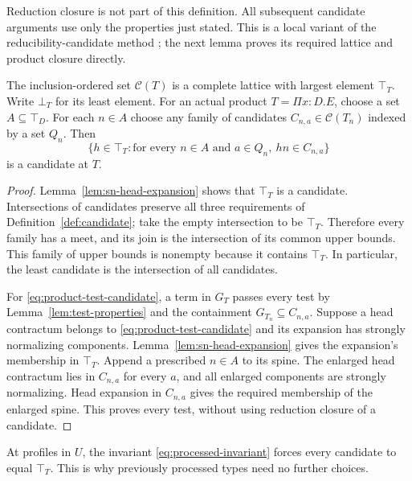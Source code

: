 Reduction closure is not part of this definition. All subsequent
candidate arguments use only the properties just stated.
This is a local variant of the reducibility-candidate method
\cite[Chapters~6 and~14]{Girard1989}; the next lemma proves its required
lattice and product closure directly.

\begin{lemma}
\label{lem:candidate-lattice}
The inclusion-ordered set $\mathcal C(T)$ is a complete lattice with
largest element $\top_T$. Write $\bot_T$ for its least element.
For an actual product $T=\Pi x:D.E$, choose a set
$A\subseteq\top_D$. For each $n\in A$ choose any family of candidates
$C_{n,a}\in\mathcal C(T_n)$ indexed by a set $Q_n$. Then
\begin{equation}
 \{h\in\top_T:\text{for every }n\in A\text{ and }a\in Q_n,
                                  \ h n\in C_{n,a}\}
\label{eq:product-test-candidate}
\end{equation}
is a candidate at $T$.
\end{lemma}

\begin{proof}
Lemma~\ref{lem:sn-head-expansion} shows that $\top_T$ is a candidate.
Intersections of candidates preserve all three requirements of
Definition~\ref{def:candidate}; take the empty intersection to be
$\top_T$. Therefore every family has a meet, and its join is the
intersection of its common upper bounds. This family of upper bounds
is nonempty because it contains $\top_T$. In particular, the least
candidate is the intersection of all candidates.

For \eqref{eq:product-test-candidate}, a term in $G_T$ passes every
test by Lemma~\ref{lem:test-properties} and the containment
$G_{T_n}\subseteq C_{n,a}$. Suppose a head contractum belongs to
\eqref{eq:product-test-candidate} and its expansion has strongly
normalizing components. Lemma~\ref{lem:sn-head-expansion} gives the
expansion's membership in $\top_T$. Append a prescribed $n\in A$ to
its spine. The enlarged head contractum lies in $C_{n,a}$ for every
$a$, and all enlarged components are strongly normalizing. Head
expansion in $C_{n,a}$ gives the required membership of the enlarged
spine. This proves every test, without using reduction closure of a
candidate.
\end{proof}

At profiles in $U$, the invariant
\eqref{eq:processed-invariant} forces every candidate to equal
$\top_T$. This is why previously processed types need no further
choices.

